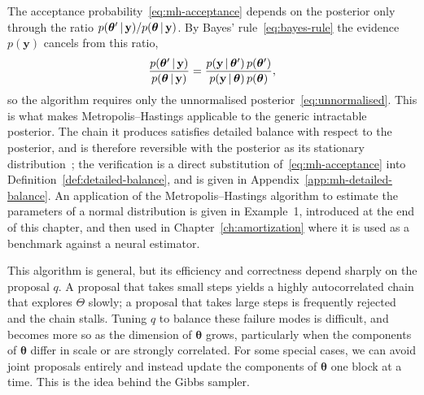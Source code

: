 \begin{algorithm}[H]
\caption{Metropolis--Hastings}
\label{alg:mh}
\end{algorithm}

The acceptance probability~\eqref{eq:mh-acceptance} depends on the
posterior only through the ratio
$p(\bm{\theta}' \,|\, \mathbf{y}) /
p(\bm{\theta} \,|\, \mathbf{y})$. By Bayes'
rule~\eqref{eq:bayes-rule} the evidence $p(\mathbf{y})$ cancels from
this ratio,
%
\begin{equation}
  \frac{p(\bm{\theta}' \,|\, \mathbf{y})}
       {p(\bm{\theta} \,|\, \mathbf{y})}
  = \frac{p(\mathbf{y} \,|\, \bm{\theta}')\,p(\bm{\theta}')}
         {p(\mathbf{y} \,|\, \bm{\theta})\,p(\bm{\theta})},
  \label{eq:ratio-cancels}
\end{equation}
%
so the algorithm requires only the unnormalised
posterior~\eqref{eq:unnormalised}. This is what makes
Metropolis--Hastings applicable to the generic intractable posterior.
The chain it produces satisfies detailed balance with respect to the
posterior, and is therefore reversible with the posterior as its
stationary distribution~\citep{chib1995understanding}; the
verification is a direct substitution of~\eqref{eq:mh-acceptance} into
Definition~\ref{def:detailed-balance}, and is given in
Appendix~\ref{app:mh-detailed-balance}. An application of the Metropolis--Hastings algorithm to estimate the parameters of a normal distribution is given in Example~1, introduced at the end of this chapter, and then used in Chapter~\ref{ch:amortization} where it is used as a benchmark against a neural estimator.

This algorithm is general, but its efficiency and correctness depend sharply on the
proposal $q$. A proposal that takes small steps yields a highly
autocorrelated chain that explores $\Theta$ slowly; a proposal that
takes large steps is frequently rejected and the chain stalls. Tuning
$q$ to balance these failure modes is difficult, and becomes more so
as the dimension of $\bm{\theta}$ grows, particularly when the
components of $\bm{\theta}$ differ in scale or are strongly
correlated. For some special cases, we can
avoid joint proposals entirely and instead update the components of
$\bm{\theta}$ one block at a time. This is the idea behind the Gibbs
sampler.


